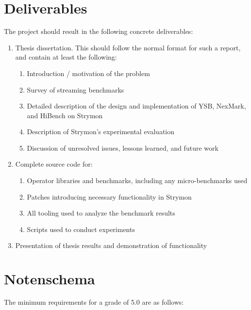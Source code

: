 \documentclass[a4paper,10pt,parskip=half]{scrartcl}
\begin{document}

\section{Deliverables}

The project should result in the following concrete deliverables:

\begin{enumerate}
  \item Thesis dissertation. This should follow the normal format for
    such a report, and contain at least the following:
    \begin{enumerate}
    \item Introduction / motivation of the problem
    \item Survey of streaming benchmarks
    \item Detailed description of the design and implementation of YSB, NexMark, and HiBench on Strymon
    \item Description of Strymon's experimental evaluation
    \item Discussion of unresolved issues, lessons learned, and future work
    \end{enumerate}

  \item Complete source code for:
    \begin{enumerate}
      \item Operator libraries and benchmarks, including any micro-benchmarks used
      \item Patches introducing necessary functionality in Strymon
      \item All tooling used to analyze the benchmark results
      \item Scripts used to conduct experiments
    \end{enumerate}

  \item Presentation of thesis results and demonstration of functionality
\end{enumerate}


\section{Notenschema}

The minimum requirements for a grade of 5.0 are as follows:
\end{document}
